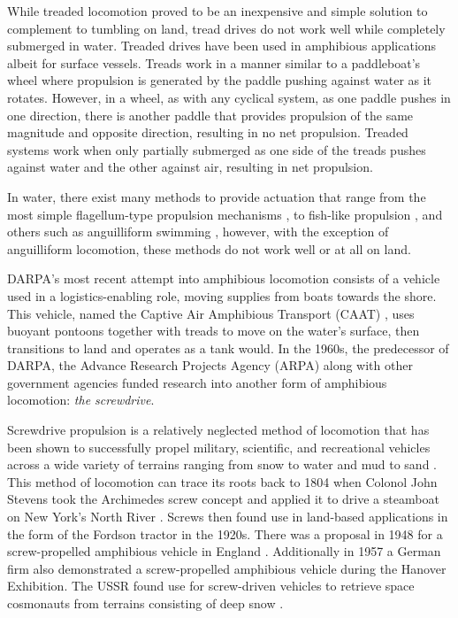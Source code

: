 
While treaded locomotion proved to be an inexpensive and simple solution to complement to tumbling on land, tread drives do not work well while completely submerged in water. Treaded drives have been used \cite{Kline2012} in amphibious applications albeit for surface vessels. Treads work in a manner similar to a paddleboat's wheel where propulsion is generated by the paddle pushing against water as it rotates. However, in a wheel, as with any cyclical system, as one paddle pushes in one direction, there is another paddle that provides propulsion of the same magnitude and opposite direction, resulting in no net propulsion. Treaded systems work when only partially submerged as one side of the treads pushes against water and the other against air, resulting in net propulsion.

In water, there exist many methods to provide actuation that range from the most simple flagellum-type propulsion mechanisms \cite{Regnier2014,Dhariwal2004, Edd2003}, to fish-like propulsion \cite{Yu2018,Massey1984}, and others such as anguilliform swimming \cite{Zhou2011}, however, with the exception of anguilliform locomotion, these methods do not work well or at all on land. %

DARPA's most recent attempt into amphibious locomotion consists of a vehicle used in a logistics-enabling role, moving supplies from boats towards the shore. This vehicle, named the Captive Air Amphibious Transport (CAAT) \cite{Kline2012}, uses buoyant pontoons together with treads to move on the water's surface, then transitions to land and operates as a tank would. In the 1960s, the predecessor of DARPA, the Advance Research Projects Agency (ARPA) along with other government agencies funded research into another form of amphibious locomotion: \emph{the screwdrive}.

Screwdrive propulsion is a relatively neglected method of locomotion that has been shown to successfully propel military, scientific, and recreational vehicles across a wide variety of terrains ranging from snow to water and mud to sand \cite{Fales1972, Cole1961, Dugoff1967}. This method of locomotion can trace its roots back to 1804 when Colonol John Stevens took the Archimedes screw concept and applied it to drive a steamboat on New York's North River \cite{Dugoff1967}. Screws then found use in land-based applications in the form of the Fordson tractor \cite{Freeberg2010} in the 1920s. There was a proposal in 1948 for a screw-propelled amphibious vehicle in England \cite{Cole1961}. Additionally in 1957 a German firm also demonstrated a screw-propelled amphibious vehicle during the Hanover Exhibition. The USSR found use for screw-driven vehicles to retrieve space cosmonauts from terrains consisting of deep snow \cite{Freeberg2010}. 


